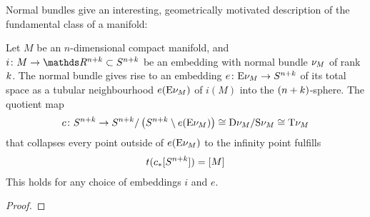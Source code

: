 Normal bundles give an interesting, geometrically motivated
description of the fundamental class of a manifold:
\begin{Lem}\label{thomisofundcl}
  Let $M$ be an $n$-dimensional compact manifold, and
  $i\colon M\to\R^{n+\rkk}\subset\Sphere{n+\rkk}$ be an embedding with
  normal bundle $\nu_{M}$ of rank $k$.
  The normal bundle gives rise to an embedding
  $e\colon \mathrm{E}\nu_{M}\to S^{n+k}$ of its total space
  as a tubular neighbourhood $e(\mathrm{E}\nu_{M})$ of $i(M)$ into the
  $(n+k)$-sphere.
  The quotient map
  \begin{gather*}
    c\colon
    S^{n+k}
    \to S^{n+k}/\left( S^{n+k}\setminus e(\mathrm{E}\nu_{M}) \right)
    \cong \mathrm{D}\nu_{M} / \mathrm{S}\nu_{M}
    \cong \mathrm{T}{\nu_{M}}
  \end{gather*}
  that collapses every point outside of $e(\mathrm{E}\nu_{M})$ to the infinity
  point fulfills
  \begin{gather*}
    t({c}_*[S^{n+k}]) = [M]
  \end{gather*}
  This holds for any choice of embeddings $i$ and $e$.
  \begin{proof}
  \end{proof}
\end{Lem}


